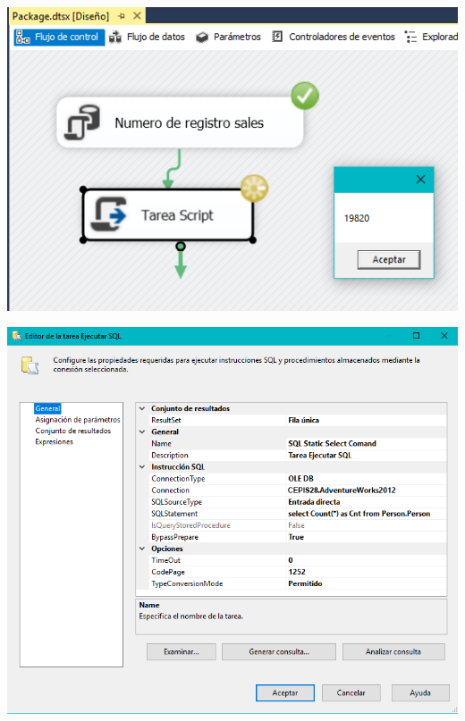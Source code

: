 	\begin{center}
	\includegraphics[width=\columnwidth]{images/task2/img22}
    \end{center}	
    
	\begin{center}
	\includegraphics[width=\columnwidth]{images/task2/img23}
    \end{center}	
    
